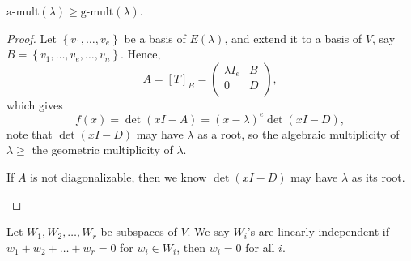 \begin{proposition}
    \(\text{a-mult}(\lambda ) \ge \text{g-mult}(\lambda ) \). 
\end{proposition}
\begin{proof}
    Let \(\left\{ v_1, \dots , v_e \right\} \) be a basis of \(E(\lambda )\), and extend it to a basis of \(V\), say \(B = \left\{ v_1, \dots , v_e, \dots , v_n\right\} \). Hence, 
    \[
        A = [T]_B = \begin{pmatrix}
            \lambda I_e & B  \\
            0 & D  \\
        \end{pmatrix},
    \] which gives 
    \[
        f(x) = \det (xI - A) = (x - \lambda )^e \det (xI - D),
    \] note that \(\det (xI-D)\) may have \(\lambda \) as a root, so the algebraic multiplicity of \(\lambda \ge \) the geometric multiplicity of \(\lambda \). 
    \begin{note}
        If \(A\) is not diagonalizable, then we know \(\det (xI - D)\) may have \(\lambda \) as its root.   
    \end{note}    
\end{proof}

\begin{definition}
    Let \(W_1, W_2, \dots , W_r\) be subspaces of \(V\). We say \(W_i\)'s are linearly independent if \(w_1 + w_2 + \dots + w_r = 0\) for \(w_i \in W_i\), then \(w_i = 0\) for all \(i\).      
\end{definition}

